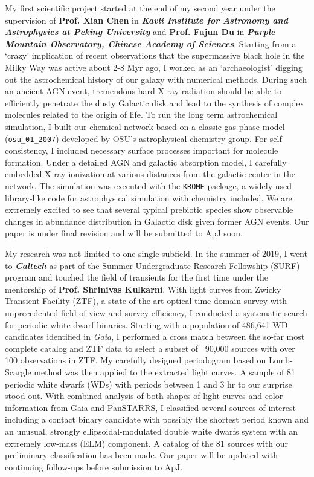 \documentclass[11pt, a4paper]{awesome-cv} %
\begin{document}
\begin{cvletter}
My first scientific project started at the end of my second year under the supervision of \textbf{Prof. Xian Chen} in \textbf{\textit{Kavli Institute for Astronomy and Astrophysics at Peking University}} and \textbf{Prof. Fujun Du} in \textbf{\textit{Purple Mountain Observatory, Chinese Academy of Sciences}}. Starting from a `crazy' implication of recent observations that the supermassive black hole in the Milky Way was active about 2-8 Myr ago, I worked as an `archaeologist' digging out the astrochemical history of our galaxy with numerical methods. During such an ancient AGN event, tremendous hard X-ray radiation should be able to efficiently penetrate the dusty Galactic disk and lead to the synthesis of complex molecules related to the origin of life. To run the long term astrochemical simulation, I built our chemical network based on a classic gas-phase model (\href{http://faculty.virginia.edu/ericherb/research_files/osu_01_2007}{\texttt{osu\_01\_2007}}) developed by OSU's astrophysical chemistry group. For self-consistency, I included necessary surface processes important for molecule formation. Under a detailed AGN and galactic absorption model, I carefully embedded X-ray ionization at various distances from the galactic center in the network. The simulation was executed with the \href{http://kromepackage.org}{\texttt{KROME}} package, a widely-used library-like code for astrophysical simulation with chemistry included. We are extremely excited to see that several typical prebiotic species show observable changes in abundance distribution in Galactic disk given former AGN events. Our paper is under final revision and will be submitted to ApJ soon.

My research was not limited to one single subfield. In the summer of 2019, I went to \textbf{\textit{Caltech}} as part of the Summer Undergraduate Research Fellowship (SURF) program and touched the field of transients for the first time under the mentorship of \textbf{Prof. Shrinivas Kulkarni}. With light curves from Zwicky Transient Facility (ZTF), a state-of-the-art optical time-domain survey with unprecedented field of view and survey efficiency, I conducted a systematic search for periodic white dwarf binaries. Starting with a population of 486,641 WD candidates identified in \textit{Gaia}, I performed a cross match between the so-far most complete catalog and ZTF data to select a subset of ~90,000 sources with over 100 observations in ZTF. My carefully designed periodogram based on Lomb-Scargle method was then applied to the extracted light curves. A sample of 81 periodic white dwarfs (WDs) with periods between 1 and 3 hr to our surprise stood out. With combined analysis of both shapes of light curves and color information from Gaia and PanSTARRS, I classified several sources of interest including a contact binary candidate with possibly the shortest period known and an unusual, strongly ellipsoidal-modulated double white dwarfs system with an extremely low-mass (ELM) component. A catalog of the 81 sources with our preliminary classification has been made. Our paper will be updated with continuing follow-ups before submission to ApJ.


\end{cvletter}
\end{document}

